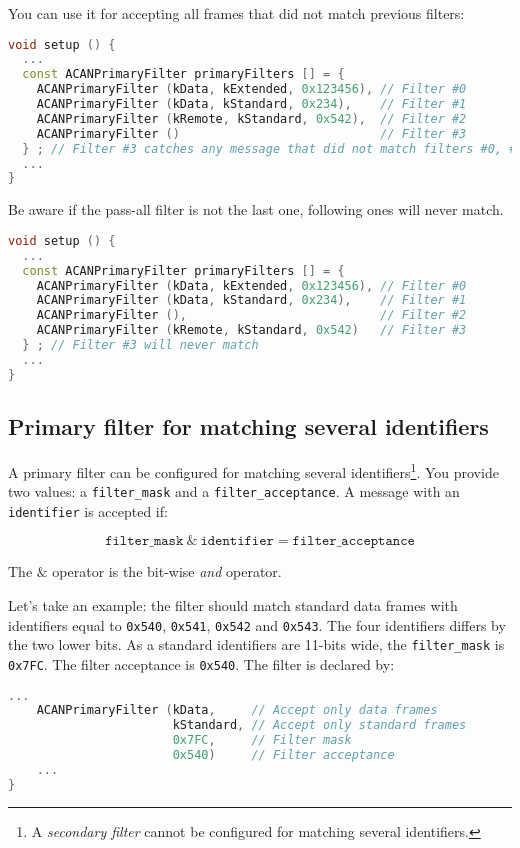 \documentclass[9pt, a4paper, obeyspaces, openany]{extarticle}
\newcommand \subsectionLabel[2]{\subsection{#1}\label{subsec:#2}}
\begin{document}
You can use it for accepting all frames that did not match previous filters:
{ \small\begin{lstlisting}[language=c++]
void setup () {
  ...
  const ACANPrimaryFilter primaryFilters [] = {
    ACANPrimaryFilter (kData, kExtended, 0x123456), // Filter #0
    ACANPrimaryFilter (kData, kStandard, 0x234),    // Filter #1
    ACANPrimaryFilter (kRemote, kStandard, 0x542),  // Filter #2
    ACANPrimaryFilter ()                            // Filter #3
  } ; // Filter #3 catches any message that did not match filters #0, #1 and #2
  ...
}
\end{lstlisting}}

Be aware if the pass-all filter is not the last one, following ones will never match.
{ \small\begin{lstlisting}[language=c++]
void setup () {
  ...
  const ACANPrimaryFilter primaryFilters [] = {
    ACANPrimaryFilter (kData, kExtended, 0x123456), // Filter #0
    ACANPrimaryFilter (kData, kStandard, 0x234),    // Filter #1
    ACANPrimaryFilter (),                           // Filter #2
    ACANPrimaryFilter (kRemote, kStandard, 0x542)   // Filter #3
  } ; // Filter #3 will never match
  ...
}
\end{lstlisting}}



\subsectionLabel{Primary filter for matching several identifiers}{primaryMultipleFilter}

A primary filter can be configured for matching several identifiers\footnote{A \emph{secondary filter} cannot be configured for matching several identifiers.}. You provide two values: a \texttt{filter\_mask} and a \texttt{filter\_acceptance}. A message with an \texttt{identifier} is accepted if:

\begin{equation*}
  \texttt{filter\_mask}~\&~\texttt{identifier} = \texttt{filter\_acceptance}
\end{equation*}

The $\&$ operator is the bit-wise \emph{and} operator.

Let's take an example: the filter should match standard data frames with identifiers equal to \texttt{0x540}, \texttt{0x541}, \texttt{0x542} and \texttt{0x543}. The four identifiers differs by the two lower bits. As a standard identifiers are 11-bits wide, the \texttt{filter\_mask} is \texttt{0x7FC}. The filter acceptance is \texttt{0x540}. The filter is declared by:

{ \small\begin{lstlisting}[language=c++]
    ...
    ACANPrimaryFilter (kData,     // Accept only data frames
                       kStandard, // Accept only standard frames
                       0x7FC,     // Filter mask
                       0x540)     // Filter acceptance
    ...
}
\end{lstlisting}}
\end{document}
